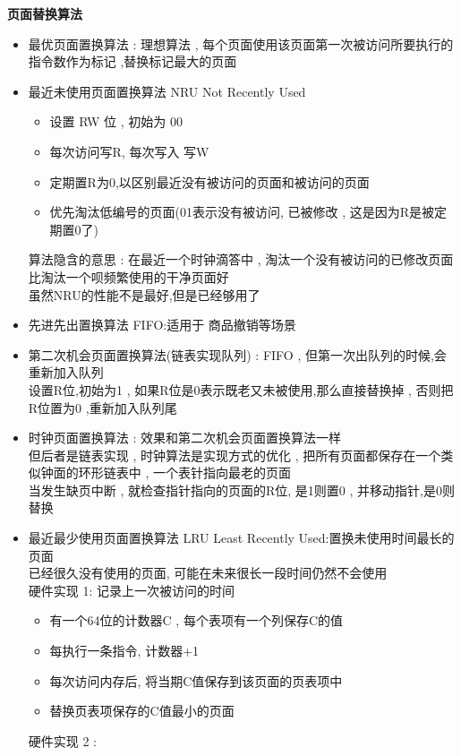 \documentclass[UTF8,a4paper]{ctexart}
\begin{document}
\textbf{页面替换算法}
\begin{itemize}
	\item 最优页面置换算法 : 理想算法 , 每个页面使用该页面第一次被访问所要执行的指令数作为标记 ,替换标记最大的页面
	\item 最近未使用页面置换算法 NRU Not Recently Used
	      \begin{itemize}
		      \item 设置 RW 位 , 初始为 00
		      \item 每次访问写R, 每次写入 写W
		      \item 定期置R为0,以区别最近没有被访问的页面和被访问的页面
		      \item 优先淘汰低编号的页面(01表示没有被访问, 已被修改 , 这是因为R是被定期置0了)
	      \end{itemize}
	      算法隐含的意思 : 在最近一个时钟滴答中 , 淘汰一个没有被访问的已修改页面比淘汰一个呗频繁使用的干净页面好\\
	      虽然NRU的性能不是最好,但是已经够用了
	\item 先进先出置换算法 FIFO:适用于 商品撤销等场景
	\item 第二次机会页面置换算法(链表实现队列) :  FIFO , 但第一次出队列的时候,会重新加入队列\\
	      设置R位,初始为1 , 如果R位是0表示既老又未被使用,那么直接替换掉 , 否则把R位置为0 ,重新加入队列尾
	\item 时钟页面置换算法 : 效果和第二次机会页面置换算法一样 \\
	      但后者是链表实现 , 时钟算法是实现方式的优化  , 把所有页面都保存在一个类似钟面的环形链表中 , 一个表针指向最老的页面 \\
	      当发生缺页中断 , 就检查指针指向的页面的R位, 是1则置0 , 并移动指针,是0则替换
	\item 最近最少使用页面置换算法 LRU Least Recently Used:置换未使用时间最长的页面\\
	      已经很久没有使用的页面, 可能在未来很长一段时间仍然不会使用\\
	      硬件实现 1: 记录上一次被访问的时间
	      \begin{itemize}
		      \item 有一个64位的计数器C , 每个表项有一个列保存C的值
		      \item 每执行一条指令, 计数器+1
		      \item 每次访问内存后, 将当期C值保存到该页面的页表项中
		      \item 替换页表项保存的C值最小的页面
	      \end{itemize}
	      硬件实现 2 :

\end{itemize}
\end{document}

